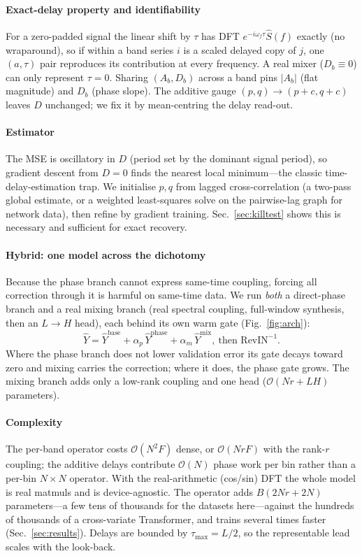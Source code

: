 \documentclass[journal,a4paper]{IEEEtran}
\begin{document}
\paragraph{Exact-delay property and identifiability} For a zero-padded signal the linear shift by
$\tau$ has DFT $e^{-i\omega_f\tau}\hat S(f)$ exactly (no wraparound), so if within a band series $i$
is a scaled delayed copy of $j$, one $(a,\tau)$ pair reproduces its contribution at every
frequency. A real mixer ($D_b\!\equiv\!0$) can only represent $\tau=0$. Sharing $(A_b,D_b)$ across a
band pins $|A_b|$ (flat magnitude) and $D_b$ (phase slope). The additive gauge
$(p,q)\!\to\!(p+c,q+c)$ leaves $D$ unchanged; we fix it by mean-centring the delay read-out.

\paragraph{Estimator} The MSE is oscillatory in $D$ (period set by the dominant signal period), so
gradient descent from $D=0$ finds the nearest local minimum---the classic time-delay-estimation
trap. We initialise $p,q$ from lagged cross-correlation (a two-pass global estimate, or a
weighted least-squares solve on the pairwise-lag graph for network data), then refine by gradient
training. Sec.~\ref{sec:killtest} shows this is necessary and sufficient for exact recovery.

\paragraph{Hybrid: one model across the dichotomy} Because the phase branch cannot express
same-time coupling, forcing all correction through it is harmful on same-time data. We run
\emph{both} a direct-phase branch and a real mixing branch (real spectral coupling, full-window
synthesis, then an $L{\to}H$ head), each behind its own warm gate (Fig.~\ref{fig:arch}):
\begin{equation}\label{eq:hybrid}
\hat{Y}=\hat{Y}^{\text{base}}+\alpha_{p}\,\hat{Y}^{\text{phase}}+\alpha_{m}\,\hat{Y}^{\text{mix}},
\ \text{then RevIN}^{-1}.
\end{equation}
Where the phase branch does not lower validation error its gate decays toward zero and mixing
carries the correction; where it does, the phase gate grows. The mixing branch adds only a low-rank
coupling and one head ($\mathcal{O}(Nr+LH)$ parameters).

\paragraph{Complexity} The per-band operator costs $\mathcal{O}(N^2F)$ dense, or
$\mathcal{O}(NrF)$ with the rank-$r$ coupling; the additive delays contribute $\mathcal{O}(N)$
phase work per bin rather than a per-bin $N{\times}N$ operator. With the real-arithmetic
(cos/sin) DFT the whole model is real matmuls and is device-agnostic. The operator adds
$B(2Nr+2N)$ parameters---a few tens of thousands for the datasets here---against the
hundreds of thousands of a cross-variate Transformer, and trains several times faster
(Sec.~\ref{sec:results}). Delays are bounded by $\tau_{\max}=L/2$, so the representable lead scales
with the look-back.
\end{document}
